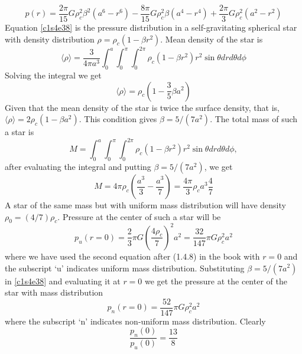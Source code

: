 \begin{enumerate}
\begin{equation}\label{c1s4e38}
p(r) = \frac{2\pi}{15}G\rho_c^2\beta^2(a^6-r^6) - \frac{8\pi}{15}G\rho_c^2\beta(a^4-r^4) +\frac{2\pi}{3}G\rho_c^2(a^2-r^2)
\end{equation}
Equation \eqref{c1s4e38} is the pressure distribution in a self-gravitating spherical star with density distribution $\rho = \rho_c(1-\beta r^2)$.
Mean density of the star is
\[
\langle\rho\rangle = \frac{3}{4\pi a^3}\int_0^a\int_0^\pi\int_0^{2\pi}\rho_c(1-\beta r^2) r^2\sin\theta dr d\theta d\phi
\]
Solving the integral we get 
\[
\langle\rho\rangle =\rho_c\left(1-\frac{3}{5}\beta a^2\right)
\]
Given that the mean density of the star is twice the surface density, that is, $\langle\rho\rangle = 2\rho_c(1 - \beta a^2)$. This condition gives $\beta=5/(7a^2)$. The total mass of such 
a star is
\[
M = \int_0^a\int_0^\pi\int_0^{2\pi}\rho_c(1-\beta r^2) r^2\sin\theta dr d\theta d\phi,
\]
after evaluating the integral and putting $\beta=5/(7a^2)$, we get
\[
M = 4\pi\rho_c\left(\frac{a^3}{3} - \frac{a^3}{7}\right) = \frac{4\pi}{3}\rho_c a^3 \frac{4}{7}
\]
A star of the same mass but with uniform mass distribution will have density $\rho_0=(4/7)\rho_c$. Pressure at the center of such a star will be
\[
p_u(r=0) = \frac{2}{3}\pi G \left(\frac{4\rho_c}{7}\right)^2 a^2 = \frac{32}{147}\pi G\rho_c^2a^2
\]
where we have used the second equation after (1.4.8) in the book with $r=0$ and the subscript \enquote*{u} indicates uniform mass distribution. Substituting $\beta=5/(7a^2)$ in 
\eqref{c1s4e38} and evaluating it at $r=0$ we get the pressure at the center of the star with mass distribution
\[
p_n(r=0) = \frac{52}{147}\pi G\rho_c^2a^2
\]
where the subscript \enquote*{n} indicates non-uniform mass distribution. Clearly 
\[
\frac{p_n(0)}{p_u(0)} = \frac{13}{8}
\]
\end{enumerate}


